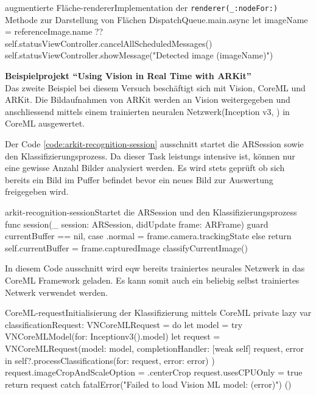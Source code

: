 \begin{description}
\begin{code}{augmentierte Fläche-renderer}{Implementation der \texttt{renderer(\_:nodeFor:)} Methode zur Darstellung von Flächen}
{			DispatchQueue.main.async {
				let imageName = referenceImage.name ?? 
				self.statusViewController.cancelAllScheduledMessages()
				self.statusViewController.showMessage("Detected image (imageName)")
			}
		}
	\end{code}


	\textbf{Beispielprojekt "`Using Vision in Real Time with ARKit"'} \\
	Das zweite Beispiel bei diesem Versuch beschäftigt sich mit Vision, CoreML und ARKit. Die Bildaufnahmen von ARKit werden an Vision weitergegeben und anschliessend mittels einem trainierten neuralen Netzwerk(Inception v3, \cite{DBLP:journals/corr/SzegedyVISW15}) in CoreML ausgewertet. 

	Der Code \ref{code:arkit-recognition-session} ausschnitt startet die ARSession sowie den Klassifizierungsprozess. Da dieser Task leistungs intensive ist, können nur eine gewisse Anzahl Bilder analysiert werden. Es wird stets geprüft ob sich bereits ein Bild im Puffer befindet bevor ein neues Bild zur Auswertung freigegeben wird.

	\begin{code}{arkit-recognition-session}{Startet die ARSession und den Klassifizierungsprozess}	
	func session(_ session: ARSession, didUpdate frame: ARFrame) {
		guard currentBuffer == nil, case .normal = frame.camera.trackingState else {
			return
		}
		self.currentBuffer = frame.capturedImage
		classifyCurrentImage()
	}
	\end{code}

	In diesem Code ausschnitt wird eqw bereits trainiertes neurales Netzwerk in das CoreML Framework geladen. Es kann somit auch ein beliebig selbst trainiertes Netwerk verwendet werden.
	\begin{code}{CoreML-request}{Initialisierung der Klassifizierung mittels CoreML}
	private lazy var classificationRequest: VNCoreMLRequest = {
		do {
			let model = try VNCoreMLModel(for: Inceptionv3().model)
			let request = VNCoreMLRequest(model: model, completionHandler: { [weak self] request, error in
				self?.processClassifications(for: request, error: error)
			})
			request.imageCropAndScaleOption = .centerCrop
			request.usesCPUOnly = true
			return request
		} catch {
			fatalError("Failed to load Vision ML model: (error)")
		}
	}()
	\end{code}


\end{description}
